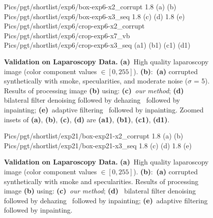 \begin{figure}[!h]
     {Pics/pgt/shortlist/exp6/box-exp6-x2_corrupt} {1.8} {(a)} {(b)}
     {Pics/pgt/shortlist/exp6/box-exp6-x3_seq} {1.8} {(c)} {(d)}
     {1.8} {(e)}
     {Pics/pgt/shortlist/exp6/crop-exp6-x2_corrupt} {Pics/pgt/shortlist/exp6/crop-exp6-x7_vb} {Pics/pgt/shortlist/exp6/crop-exp6-x3_seq}  {(a1)} {(b1)} {(c1)} {(d1)}
    \caption
    {
        {\bf Validation on Laparoscopy Data. }
        {\bf (a)}~High quality laparoscopy image (color component values $\in [0,255]$).
        {\bf (b)}:~{\bf (a)} corrupted synthetically with smoke, specularities, and moderate noise ($\sigma$ = 5).
        Results of processing image {\bf (b)} using:
        {\bf (c)}~{\em our method};
        {\bf (d)}~ bilateral filter denoising followed by dehazing~\cite{he2011dark} followed by inpainting;
        {\bf (e)}~adaptive filtering~\cite{gibson2013wiener} followed by inpainting.
        Zoomed insets of {\bf (a)}, {\bf (b)}, {\bf (c)}, {\bf (d)} are {\bf (a1)}, {\bf (b1)}, {\bf (c1)}, {\bf (d1)}.
    }
    \label{fig:imagesPgt2}
\end{figure}

\begin{figure}[!h]
     {Pics/pgt/shortlist/exp21/box-exp21-x2_corrupt} {1.8} {(a)} {(b)}
     {Pics/pgt/shortlist/exp21/box-exp21-x3_seq}  {1.8} {(c)} {(d)}
     {1.8} {(e)}
    \caption
    {
        {\bf Validation on Laparoscopy Data. }
        {\bf (a)}~High quality laparoscopy image (color component values $\in [0,255]$).
        {\bf (b)}:~{\bf (a)} corrupted synthetically with smoke and specularities.
        Results of processing image {\bf (b)} using:
        {\bf (c)}~{\em our method};
        {\bf (d)}~ bilateral filter denoising followed by dehazing~\cite{he2011dark} followed by inpainting;
        {\bf (e)}~adaptive filtering~\cite{gibson2013wiener} followed by inpainting.
    }
    \label{fig:imagesPgt3}
\end{figure}


